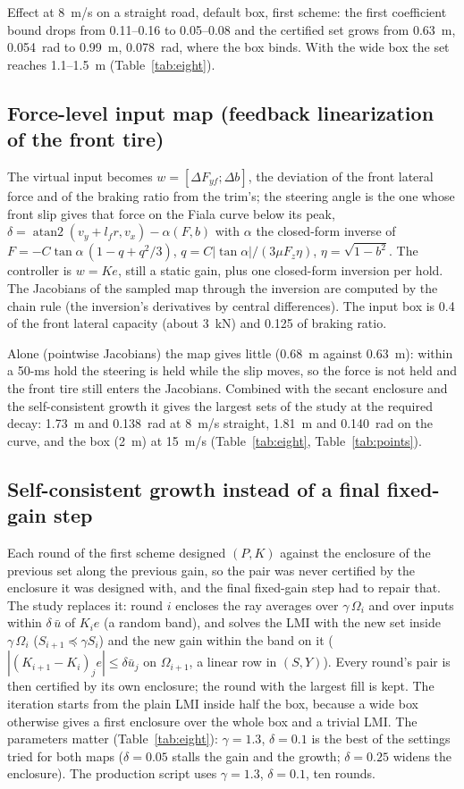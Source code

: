 \documentclass[11pt]{article}
\begin{document}
Effect at 8~m/s on a straight road, default box, first scheme: the first
coefficient bound drops from 0.11--0.16 to 0.05--0.08 and the certified set
grows from 0.63~m, 0.054~rad to 0.99~m, 0.078~rad, where the box binds. With
the wide box the set reaches 1.1--1.5~m (Table~\ref{tab:eight}).

\subsection{Force-level input map (feedback linearization of the front tire)}
The virtual input becomes $w=[\Delta F_{yf};\Delta b]$, the deviation of the
front lateral force and of the braking ratio from the trim's; the steering
angle is the one whose front slip gives that force on the Fiala curve below
its peak, $\delta=\operatorname{atan2}(v_y+l_f r,v_x)-\alpha(F,b)$ with
$\alpha$ the closed-form inverse of $F=-C\tan\alpha\,(1-q+q^2/3)$,
$q=C|\tan\alpha|/(3\mu F_z\eta)$, $\eta=\sqrt{1-b^2}$. The controller is
$w=Ke$, still a static gain, plus one closed-form inversion per hold. The
Jacobians of the sampled map through the inversion are computed by the chain
rule (the inversion's derivatives by central differences). The input box is
0.4 of the front lateral capacity (about 3~kN) and 0.125 of braking ratio.

Alone (pointwise Jacobians) the map gives little (0.68~m against 0.63~m):
within a 50-ms hold the steering is held while the slip moves, so the force
is not held and the front tire still enters the Jacobians. Combined with the
secant enclosure and the self-consistent growth it gives the largest sets of
the study at the required decay: 1.73~m and 0.138~rad at 8~m/s straight,
1.81~m and 0.140~rad on the curve, and the box (2~m) at 15~m/s
(Table~\ref{tab:eight}, Table~\ref{tab:points}).

\subsection{Self-consistent growth instead of a final fixed-gain step}
Each round of the first scheme designed $(P,K)$ against the enclosure of the
previous set along the previous gain, so the pair was never certified by the
enclosure it was designed with, and the final fixed-gain step had to repair
that. The study replaces it: round $i$ encloses the ray averages over
$\gamma\,\Omega_i$ and over inputs within $\delta\,\bar u$ of $K_i e$ (a
random band), and solves the LMI with the new set inside $\gamma\,\Omega_i$
($S_{i+1}\preceq\gamma S_i$) and the new gain within the band on it
($|(K_{i+1}-K_i)_j e|\le\delta\bar u_j$ on $\Omega_{i+1}$, a linear row in
$(S,Y)$). Every round's pair is then certified by its own enclosure; the
round with the largest fill is kept. The iteration starts from the plain LMI
inside half the box, because a wide box otherwise gives a first enclosure
over the whole box and a trivial LMI. The parameters matter
(Table~\ref{tab:eight}): $\gamma=1.3$, $\delta=0.1$ is the best of the
settings tried for both maps ($\delta=0.05$ stalls the gain and the growth;
$\delta=0.25$ widens the enclosure). The production script uses
$\gamma=1.3$, $\delta=0.1$, ten rounds.
\end{document}
